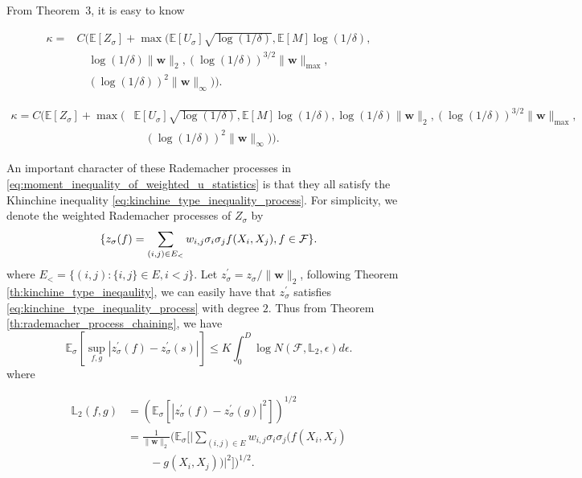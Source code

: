 \documentclass[letterpaper]{article} %
\def\DoubleColumn{}
\def\DoubleColumnEnd{}
\def\SingleColumn{}
\def\SingleColumnEnd{}
\newcommand{\E}{\mathbb{E}}
\newcommand{\weight}{\mathbf{w}}
\newcommand{\rademacher}{\sigma}
\newcommand{\pair}[1]{(#1)}
\newcommand{\lebesgue}{\mathbb{L}}
\begin{document}
    From Theorem~3, it is easy to know
    \DoubleColumn
    \begin{equation}
        \begin{aligned}
            \label{eq:moment_inequality_of_weighted_u_statistics}
            \kappa=&C(\E[Z_\rademacher]+\max(\E[U_\rademacher]\sqrt{\log(1/\delta)},\E[M]\log(1/\delta),\\
            &\quad\log(1/\delta)\|\weight{}\|_2,(\log(1/\delta))^{3/2}\|\weight{}\|_{\max},\\
            &\quad (\log(1/\delta))^2\|\weight{}\|_\infty)).
        \end{aligned}
    \end{equation}
    \DoubleColumnEnd
    \SingleColumn
    \begin{equation}
        \begin{aligned}
            \label{eq:moment_inequality_of_weighted_u_statistics}
            \kappa=C(\E[Z_\rademacher]+\max(&\E[U_\rademacher]\sqrt{\log(1/\delta)},\E[M]\log(1/\delta),\log(1/\delta)\|\weight{}\|_2,(\log(1/\delta))^{3/2}\|\weight{}\|_{\max},\\
            &\quad (\log(1/\delta))^2\|\weight{}\|_\infty)).
        \end{aligned}
    \end{equation}
    \SingleColumnEnd
An important character of these Rademacher processes in \eqref{eq:moment_inequality_of_weighted_u_statistics} is that they all satisfy the Khinchine inequality \eqref{eq:kinchine_type_inequality_process}. For simplicity, we denote the weighted Rademacher processes of $Z_\rademacher$ by 
\[\{z_\rademacher(f)=\sum_{\pair{i,j}\in E_<}w_{i,j}\rademacher_i\rademacher_j\linebreak f(X_i,X_j), f\in\mathcal{F}\}.\]
where $E_<=\{(i,j): \{i,j\}\in E, i<j\}$. Let $z_\rademacher^\prime=z_\rademacher/\|\weight{}\|_2$, following Theorem \ref{th:kinchine_type_ineqaulity}, we can easily have that $z_\rademacher^\prime$ satisfies \eqref{eq:kinchine_type_inequality_process} with degree $2$. Thus from Theorem \ref{th:rademacher_process_chaining}, we have
\begin{equation}
    \label{eq:weighted_rademacher_process_prove_1}
    \E_\rademacher[\sup_{f,g}|z^\prime_\rademacher(f)-z^\prime_\rademacher(s)|]\le K\int_0^D\log N(\mathcal F,\lebesgue{}_2,\epsilon)d\epsilon.
\end{equation}
where 
\DoubleColumn
\begin{align*}
    \lebesgue{}_2(f,g)&=(\E_\rademacher[|z^\prime_\rademacher(f)-z^\prime_\rademacher(g)|^2])^{1/2}\\
    &=\frac{1}{\|\weight{}\|_2}(\E_\rademacher[|\sum_{\pair{i,j}\in E}w_{i,j}\rademacher_i\rademacher_j(f(X_i,X_j)\\
    &\qquad-g(X_i,X_j))|^2])^{1/2}.
\end{align*}
\end{document}
